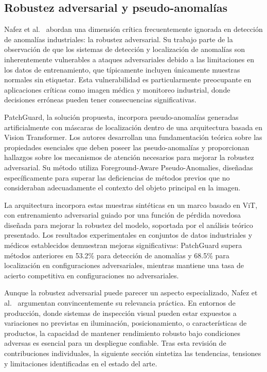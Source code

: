 \subsection{Robustez adversarial y pseudo-anomalías}

Nafez et al.~\cite{nafez2025patchguard} abordan una dimensión crítica frecuentemente ignorada en detección de anomalías industriales: la robustez adversarial. Su trabajo parte de la observación de que los sistemas de detección y localización de anomalías son inherentemente vulnerables a ataques adversariales debido a las limitaciones en los datos de entrenamiento, que típicamente incluyen únicamente muestras normales sin etiquetar. Esta vulnerabilidad es particularmente preocupante en aplicaciones críticas como imagen médica y monitoreo industrial, donde decisiones erróneas pueden tener consecuencias significativas.

PatchGuard, la solución propuesta, incorpora pseudo-anomalías generadas artificialmente con máscaras de localización dentro de una arquitectura basada en Vision Transformer. Los autores desarrollan una fundamentación teórica sobre las propiedades esenciales que deben poseer las pseudo-anomalías y proporcionan hallazgos sobre los mecanismos de atención necesarios para mejorar la robustez adversarial. Su método utiliza Foreground-Aware Pseudo-Anomalies, diseñadas específicamente para superar las deficiencias de métodos previos que no consideraban adecuadamente el contexto del objeto principal en la imagen.

La arquitectura incorpora estas muestras sintéticas en un marco basado en ViT, con entrenamiento adversarial guiado por una función de pérdida novedosa diseñada para mejorar la robustez del modelo, soportada por el análisis teórico presentado. Los resultados experimentales en conjuntos de datos industriales y médicos establecidos demuestran mejoras significativas: PatchGuard supera métodos anteriores en 53.2\% para detección de anomalías y 68.5\% para localización en configuraciones adversariales, mientras mantiene una tasa de acierto competitiva en configuraciones no adversariales.

Aunque la robustez adversarial puede parecer un aspecto especializado, Nafez et al.~\cite{nafez2025patchguard} argumentan convincentemente su relevancia práctica. En entornos de producción, donde sistemas de inspección visual pueden estar expuestos a variaciones no previstas en iluminación, posicionamiento, o características de productos, la capacidad de mantener rendimiento robusto bajo condiciones adversas es esencial para un despliegue confiable. Tras esta revisión de contribuciones individuales, la siguiente sección sintetiza las tendencias, tensiones y limitaciones identificadas en el estado del arte.

